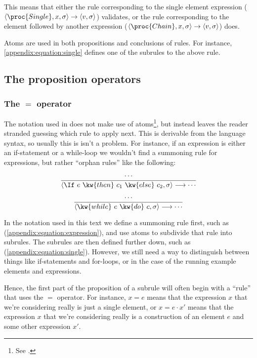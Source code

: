 This means that either the rule corresponding to the single element expression
($\left\langle \proc{Single}, x,\sigma\right\rangle\rightarrow\left\langle
v,\sigma\right\rangle$) validates, or the rule corresponding to the element
followed by another expression ($\left\langle \proc{Chain},
x,\sigma\right\rangle\rightarrow\left\langle v,\sigma\right\rangle$) does.

Atoms are used in both propositions and conclusions of rules. For instance,
\ref{appendix:equation:single} defines one of the subrules to the above rule.

\subsection{The proposition operators}

\subsubsection{The $=$ operator}

The notation used in \cite{sos} does not make use of atoms\footnote{See
.}, but instead leaves the reader stranded guessing
which rule to apply next. This is derivable from the language syntax, so
usually this is isn't a problem. For instance, if an expression is either an
if-statement or a while-loop we wouldn't find a summoning rule for expressions,
but rather ``orphan rules'' like the following:

\begin{equation*}
{\displaystyle
  \cdots
\over\displaystyle
  \left\langle\If\ e\ \kw{then}\ c_1\ \kw{else}\ c_2, \sigma\right\rangle
  \longrightarrow
  \cdots
}
\end{equation*}

\begin{equation*}
{\displaystyle
  \cdots
\over\displaystyle
  \left\langle\kw{while}\ e\ \kw{do}\ c, \sigma\right\rangle
  \longrightarrow
  \cdots
}
\end{equation*}

In the notation used in this text we define a summoning rule first, such as
(\ref{appendix:equation:expression}), and use atoms to subdivide that rule into
subrules. The subrules are then defined further down, such as
(\ref{appendix:equation:single}). However, we still need a way to distinguish
between things like if-statements and for-loops, or in the case of the running
example elements and expressions.

Hence, the first part of the proposition of a subrule will often begin with a
``rule'' that uses the $=$ operator. For instance, $x = e$ means that the
expression $x$ that we're considering really is just a single element, or $x =
e\cdot x'$ means that the expression $x$ that we're considering really is a
construction of an element $e$ and some other expression $x'$.

